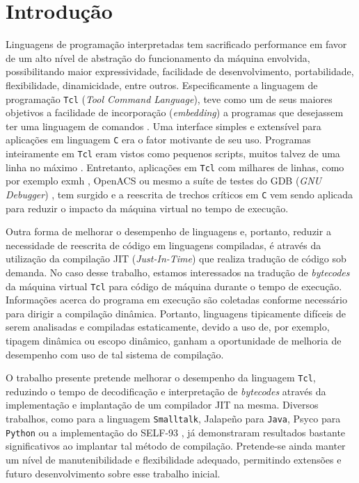 \section{Introdução}

Linguagens de programação interpretadas tem sacrificado performance
em favor de um alto nível de abstração do funcionamento da máquina
envolvida, possibilitando maior expressividade, facilidade de
desenvolvimento, portabilidade, flexibilidade, dinamicidade, entre outros.
Especificamente a linguagem de programação \texttt{Tcl}
(\textit{Tool Command Language}), teve como um de seus maiores
objetivos a facilidade de incorporação (\textit{embedding}) a
programas que desejassem ter uma linguagem de comandos
\cite{ousterhout_89}. Uma interface simples e extensível para
aplicações em linguagem \texttt{C} era o fator motivante de seu uso.
Programas inteiramente em \texttt{Tcl} eram vistos como pequenos
scripts, muitos talvez de uma linha no máximo \cite{ousterhout_89}.
Entretanto, aplicações em \texttt{Tcl} com milhares de linhas,
como por exemplo exmh \cite{exmh}, OpenACS \cite{openacs} ou mesmo a
suíte de testes do GDB (\textit{GNU Debugger}) \cite{gdb_testsuite},
tem surgido e a reescrita de trechos críticos em \texttt{C} vem sendo
aplicada para reduzir o impacto da máquina virtual no tempo de execução.

Outra forma de melhorar o desempenho de linguagens e, portanto,
reduzir a necessidade de reescrita de código em linguagens compiladas,
é através da utilização da compilação JIT (\textit{Just-In-Time}) que
realiza tradução de código sob demanda. No caso desse trabalho, estamos
interessados na tradução de \textit{bytecodes} da máquina virtual
\texttt{Tcl} para código de máquina durante o tempo de execução.
Informações acerca do programa em execução são coletadas
conforme necessário para dirigir a compilação dinâmica. Portanto,
linguagens tipicamente difíceis de serem analisadas e compiladas
estaticamente, devido a uso de, por exemplo, tipagem dinâmica ou
escopo dinâmico, ganham a oportunidade de melhoria de desempenho
com uso de tal sistema de compilação.

O trabalho presente pretende melhorar o desempenho da linguagem
\texttt{Tcl}, reduzindo o tempo de decodificação e interpretação
de \textit{bytecodes} através da implementação e implantação de um
compilador JIT na mesma. Diversos trabalhos, como
\cite{deutsch84efficient} para a linguagem \texttt{Smalltalk},
Jalapeño \cite{jalapeno_1} para \texttt{Java}, Psyco \cite{psyco}
para \texttt{Python} ou a implementação do SELF-93 \cite{holzle}, já
demonstraram resultados bastante significativos ao implantar tal
método de compilação. Pretende-se ainda manter um nível de
manutenibilidade e flexibilidade adequado, permitindo extensões e
futuro desenvolvimento sobre esse trabalho inicial.

